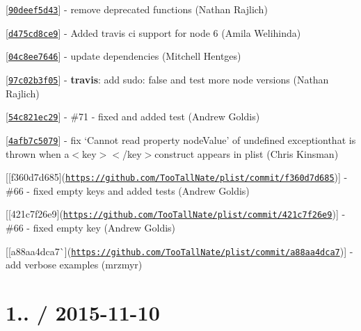 \begin{DoxyItemize}
\item \mbox{[}\href{https://github.com/TooTallNate/plist/commit/90deef5d43}{\tt {\ttfamily 90deef5d43}}\mbox{]} -\/ remove deprecated functions (Nathan Rajlich)
\item \mbox{[}\href{https://github.com/TooTallNate/plist/commit/d475cd8ce9}{\tt {\ttfamily d475cd8ce9}}\mbox{]} -\/ Added travis ci support for node 6 (Amila Welihinda)
\item \mbox{[}\href{https://github.com/TooTallNate/plist/commit/04c8ee7646}{\tt {\ttfamily 04c8ee7646}}\mbox{]} -\/ update dependencies (Mitchell Hentges)
\item \mbox{[}\href{https://github.com/TooTallNate/plist/commit/97c02b3f05}{\tt {\ttfamily 97c02b3f05}}\mbox{]} -\/ {\bfseries travis}\+: add {\ttfamily sudo\+: false} and test more node versions (Nathan Rajlich)
\item \mbox{[}\href{https://github.com/TooTallNate/plist/commit/54c821ec29}{\tt {\ttfamily 54c821ec29}}\mbox{]} -\/ \#71 -\/ fixed and added test (Andrew Goldis)
\item \mbox{[}\href{https://github.com/TooTallNate/plist/commit/4afb7c5079}{\tt {\ttfamily 4afb7c5079}}\mbox{]} -\/ fix `Cannot read property \textquotesingle{}node\+Value' of undefined exception{\ttfamily that is thrown when a}$<$key$>$$<$/key$>${\ttfamily construct appears in plist (Chris Kinsman)}
\item {\ttfamily \mbox{[}\mbox{[}}f360d7d685{\ttfamily \mbox{]}(\href{https://github.com/TooTallNate/plist/commit/f360d7d685}{\tt https\+://github.\+com/\+Too\+Tall\+Nate/plist/commit/f360d7d685})\mbox{]} -\/ \#66 -\/ fixed empty keys and added tests (Andrew Goldis)}
\item {\ttfamily \mbox{[}\mbox{[}}421c7f26e9{\ttfamily \mbox{]}(\href{https://github.com/TooTallNate/plist/commit/421c7f26e9}{\tt https\+://github.\+com/\+Too\+Tall\+Nate/plist/commit/421c7f26e9})\mbox{]} -\/ \#66 -\/ fixed empty key (Andrew Goldis)}
\item {\ttfamily \mbox{[}\mbox{[}}a88aa4dca7\`{}\mbox{]}(\href{https://github.com/TooTallNate/plist/commit/a88aa4dca7}{\tt https\+://github.\+com/\+Too\+Tall\+Nate/plist/commit/a88aa4dca7})\mbox{]} -\/ add verbose examples (mrzmyr)
\end{DoxyItemize}

\section*{1.. / 2015-\/11-\/10 }


